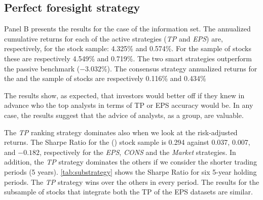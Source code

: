 \documentclass[a4paper,12pt,openright,notitlepage]{report}\usepackage[]{graphicx}\usepackage[]{color}
\begin{document}
\subsection{Perfect foresight strategy}
\label{ch1-sec:perfect}
Panel B presents the results for the case of the \tr{} information set. The annualized cumulative returns for each of the active strategies (\textit{TP} and \textit{EPS}) are, respectively, for the \all{} stock sample: 4.325\% and  0.574\%. For the \same{} sample of stocks these are respectively 4.549\% and 0.719\%. The two smart strategies outperform the passive benchmark (\ensuremath{-3.032}\%).  The consensus strategy annualized returns for the \all{} and the \same{} sample of stocks are respectively   0.116\% and  0.434\%


The results show, as expected, that  investors would better off if they knew in advance who the top analysts in terms of TP or EPS accuracy would be. In any case, the results suggest that the advice of analysts, as a group, are valuable.


The \textit{TP} ranking strategy dominates also when we look at the risk-adjusted returns. The Sharpe Ratio for the \all{} (\same{}) stock sample is 0.294 against 0.037, 0.007, and \ensuremath{-0.182}, respectively for  the \textit{EPS}, \textit{CONS} and the \textit{Market} strategies. In addition, the \textit{TP} strategy dominates  the others if we consider the shorter trading periods (5 years). \ref{tab:substrategy} shows the Sharpe Ratio for six 5-year holding periods. The \textit{TP} strategy wins over the others in every period. The results for the subsample of stocks that integrate both the TP of the EPS datasets are similar.
\end{document}
